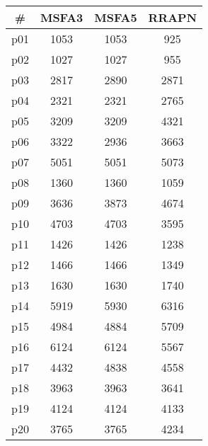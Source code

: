 \begin{tabular}{cccc}
\toprule
\textbf{\#} & \textbf{MSFA3} & \textbf{MSFA5} & \textbf{RRAPN}\\
\midrule
p01 & 1053 & 1053 & 925\\
p02 & 1027 & 1027 & 955\\
p03 & 2817 & 2890 & 2871\\
p04 & 2321 & 2321 & 2765\\
p05 & 3209 & 3209 & 4321\\
p06 & 3322 & 2936 & 3663\\
p07 & 5051 & 5051 & 5073\\
p08 & 1360 & 1360 & 1059\\
p09 & 3636 & 3873 & 4674\\
p10 & 4703 & 4703 & 3595\\
p11 & 1426 & 1426 & 1238\\
p12 & 1466 & 1466 & 1349\\
p13 & 1630 & 1630 & 1740\\
p14 & 5919 & 5930 & 6316\\
p15 & 4984 & 4884 & 5709\\
p16 & 6124 & 6124 & 5567\\
p17 & 4432 & 4838 & 4558\\
p18 & 3963 & 3963 & 3641\\
p19 & 4124 & 4124 & 4133\\
p20 & 3765 & 3765 & 4234\\
\bottomrule
\end{tabular}

